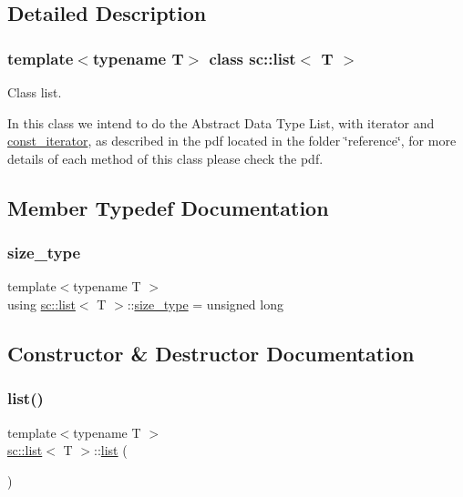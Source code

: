 \subsection{Detailed Description}
\subsubsection*{template$<$typename T$>$\newline
class sc\+::list$<$ T $>$}

Class list. 

In this class we intend to do the Abstract Data Type List, with iterator and \hyperlink{classsc_1_1list_1_1const__iterator}{const\+\_\+iterator}, as described in the pdf located in the folder \char`\"{}reference\char`\"{}, for more details of each method of this class please check the pdf. 

\subsection{Member Typedef Documentation}
\mbox{\label{classsc_1_1list_acbac64cff34d45bb9c61771493db48ec}} 
\subsubsection{\texorpdfstring{size\+\_\+type}{size\_type}}
{\footnotesize\ttfamily template$<$typename T $>$ \\
using \hyperlink{classsc_1_1list}{sc\+::list}$<$ T $>$\+::\hyperlink{classsc_1_1list_acbac64cff34d45bb9c61771493db48ec}{size\+\_\+type} =  unsigned long}



\subsection{Constructor \& Destructor Documentation}
\mbox{\label{classsc_1_1list_ac7b95807230114dc58f2b1156cb3cdba}} 
\subsubsection{\texorpdfstring{list()}{list()}\hspace{0.1cm}{\footnotesize\ttfamily [1/5]}}
{\footnotesize\ttfamily template$<$typename T $>$ \\
\hyperlink{classsc_1_1list}{sc\+::list}$<$ T $>$\+::\hyperlink{classsc_1_1list}{list} (\begin{DoxyParamCaption}{ }\end{DoxyParamCaption})\hspace{0.3cm}{\ttfamily [inline]}}



